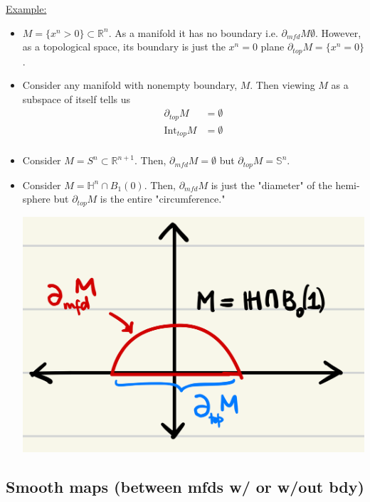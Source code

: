 \documentclass{article}
\newcommand{\R}{\mathbb{R}}
\begin{document}
\vskip 0.5cm
\underline{Example:} 
\begin{itemize}
  \item $M = \{ x^n > 0 \} \subset \R^n$. As a manifold it has no boundary i.e. $\partial_{mfd}M  \emptyset$. However, as a topological space, its boundary is just the $x^n = 0 $ plane $\partial_{top}M = \{x^n = 0\}$. 
  
  \item Consider any manifold with nonempty boundary, $M$. Then viewing $M$ as a subspace of itself tells us
  \begin{align*}
    \partial_{top}M &= \emptyset \\
    \text{Int}_{top}M &= \emptyset \\
  \end{align*}

  \item Consider $M = S^n \subset \R^{n+1}$. Then, $\partial_{mfd} M = \emptyset$ but $\partial_{top}M = \mathbb{S}^n$.
  
  \item Consider $M = \mathbb{H}^n \cap B_1(0)$. Then, $\partial_{mfd}M$ is just the "diameter" of the hemi-sphere but $\partial_{top}M$ is the entire "circumference."
  
  \begin{center}
    \includegraphics*[scale=0.10]{boundary_discrepancy.png}
  \end{center}

\end{itemize}


\vskip 1cm
\subsection{Smooth maps (between mfds w/ or w/out bdy)}
\end{document}
